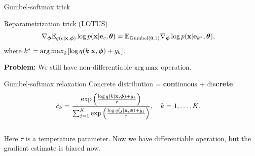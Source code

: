 \begin{frame}{Gumbel-softmax trick}
	\begin{block}{Reparametrization trick (LOTUS)}
		\vspace{-0.7cm}
		\[
			\nabla_{\boldsymbol{\phi}} \mathbb{E}_{q(c | \mathbf{x}, \boldsymbol{\phi})} \log p(\mathbf{x} | \mathbf{e}_{c} , \boldsymbol{\theta}) = \mathbb{E}_{\text{Gumbel}(0, 1)} \nabla_{\boldsymbol{\phi}} \log p(\mathbf{x} | \mathbf{e}_{k^*} , \boldsymbol{\theta}),
		\]
		where $k^* = \operatorname*{arg\,max}_k [\log q(k | \mathbf{x}, \boldsymbol{\phi}) + g_k]$.
	\end{block}
	\textbf{Problem:} We still have non-differentiable $\operatorname*{arg\,max}$ operation.
	
	\begin{block}{Gumbel-softmax relaxation}
		{\color{violet}Con}{\color{cyan}crete} distribution = {\color{violet}\textbf{con}tinuous} + {\color{cyan}dis\textbf{crete}}
		\vspace{-0.2cm}
		\[
			\hat{c}_k = \frac{\exp \left(\frac{\log q(k | \mathbf{x}, \boldsymbol{\phi}) + g_k}{\tau}\right)}{\sum_{j=1}^K \exp \left(\frac{\log q(j | \mathbf{x}, \boldsymbol{\phi}) + g_j}{\tau}\right)}, \quad k = 1, \dots, K.
		\]
		\vspace{-0.4cm} \\
		Here $\tau$ is a temperature parameter. Now we have differentiable operation, but the gradient estimate is biased now.
 	\end{block}
\end{frame}
